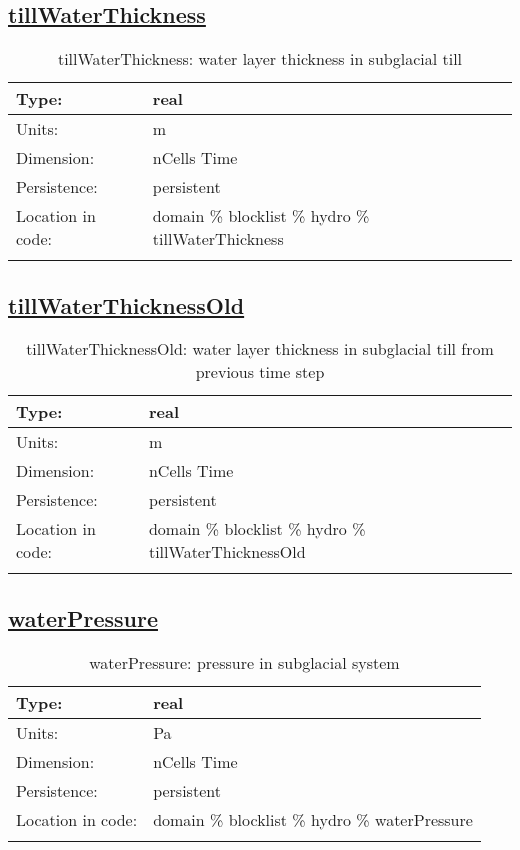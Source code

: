 \subsection[tillWaterThickness]{\hyperref[sec:var_tab_hydro]{tillWaterThickness}}
\label{subsec:var_sec_hydro_tillWaterThickness}
\begin{center}
\begin{longtable}{| p{2.0in} | p{4.0in} |}
        \hline 
        Type: & real \\
        \hline 
        Units: & \si{m} \\
        \hline 
        Dimension: & nCells Time \\
        \hline 
        Persistence: & persistent \\
        \hline 
         Location in code: & domain \% blocklist \% hydro \% tillWaterThickness \\
         \hline 
    \caption{tillWaterThickness: water layer thickness in subglacial till}
\end{longtable}
\end{center}
\subsection[tillWaterThicknessOld]{\hyperref[sec:var_tab_hydro]{tillWaterThicknessOld}}
\label{subsec:var_sec_hydro_tillWaterThicknessOld}
\begin{center}
\begin{longtable}{| p{2.0in} | p{4.0in} |}
        \hline 
        Type: & real \\
        \hline 
        Units: & \si{m} \\
        \hline 
        Dimension: & nCells Time \\
        \hline 
        Persistence: & persistent \\
        \hline 
         Location in code: & domain \% blocklist \% hydro \% tillWaterThicknessOld \\
         \hline 
    \caption{tillWaterThicknessOld: water layer thickness in subglacial till from previous time step}
\end{longtable}
\end{center}
\subsection[waterPressure]{\hyperref[sec:var_tab_hydro]{waterPressure}}
\label{subsec:var_sec_hydro_waterPressure}
\begin{center}
\begin{longtable}{| p{2.0in} | p{4.0in} |}
        \hline 
        Type: & real \\
        \hline 
        Units: & \si{Pa} \\
        \hline 
        Dimension: & nCells Time \\
        \hline 
        Persistence: & persistent \\
        \hline 
         Location in code: & domain \% blocklist \% hydro \% waterPressure \\
         \hline 
    \caption{waterPressure: pressure in subglacial system}
\end{longtable}
\end{center}

